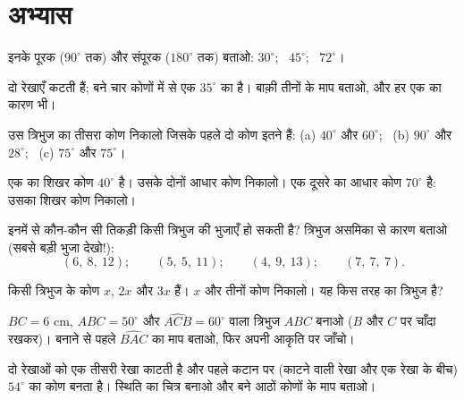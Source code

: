 \section{अभ्यास}

\begin{exercise}[$\star$]\label{exo:g7:triangles:1}
इनके पूरक ($90^\circ$ तक) और संपूरक ($180^\circ$ तक) बताओ:
$30^\circ$; \ $45^\circ$; \ $72^\circ$।
\end{exercise}

\begin{exercise}[$\star$]\label{exo:g7:triangles:2}
दो रेखाएँ कटती हैं; बने चार कोणों में से एक $35^\circ$ का है।
बाक़ी तीनों के माप बताओ, और हर एक का कारण भी।
\end{exercise}

\begin{exercise}[$\star$]\label{exo:g7:triangles:3}
उस त्रिभुज का तीसरा कोण निकालो जिसके पहले दो कोण इतने हैं:
(a) $40^\circ$ और $60^\circ$; \
(b) $90^\circ$ और $28^\circ$; \
(c) $75^\circ$ और $75^\circ$।
\end{exercise}

\begin{exercise}[$\star$]\label{exo:g7:triangles:4}
एक  का शिखर कोण $40^\circ$ है। उसके दोनों आधार
कोण निकालो। एक दूसरे  का आधार कोण $70^\circ$ है:
उसका शिखर कोण निकालो।
\end{exercise}

\begin{exercise}[$\star$]\label{exo:g7:triangles:5}
इनमें से कौन-कौन सी तिकड़ी किसी त्रिभुज की भुजाएँ हो सकती है?
त्रिभुज असमिका से कारण बताओ (सबसे बड़ी भुजा देखो!):
\[
(6,\ 8,\ 12); \qquad
(5,\ 5,\ 11); \qquad
(4,\ 9,\ 13); \qquad
(7,\ 7,\ 7).
\]
\end{exercise}

\begin{exercise}[$\star$]\label{exo:g7:triangles:6}
किसी त्रिभुज के कोण $x$, $2x$ और $3x$ हैं। $x$ और तीनों कोण
निकालो। यह किस तरह का त्रिभुज है?
\end{exercise}

\begin{exercise}[$\star$]\label{exo:g7:triangles:7}
$BC = 6$ cm, $\widehat{ABC} = 50^\circ$ और
$\widehat{ACB} = 60^\circ$ वाला त्रिभुज $ABC$ बनाओ ($B$ और $C$ पर
चाँदा रखकर)। बनाने से पहले $\widehat{BAC}$ का माप बताओ, फिर अपनी
आकृति पर जाँचो।
\end{exercise}

\begin{exercise}[$\star\star$]\label{exo:g7:triangles:8}
दो  रेखाओं को एक तीसरी रेखा काटती है और पहले कटान पर
(काटने वाली रेखा और एक \omterm{def:g6:lines:perp}{समांतर} रेखा के बीच) $54^\circ$ का कोण बनता
है। स्थिति का चित्र बनाओ और बने आठों कोणों के माप बताओ।
\end{exercise}

